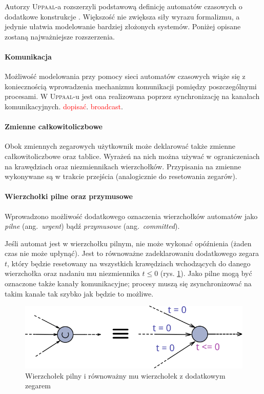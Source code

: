 \documentclass{pracamgr}
\newcommand{\ang}[1]{(ang.~\emph{#1})}
\newcommand{\todo}[1]{\textcolor{red}{#1}}
\newcommand{\upp}{\textsc{Uppaal}}
\theoremstyle{plain}
\begin{document}
Autorzy \upp-a rozszerzyli podstawową definicję automatów czasowych o
dodatkowe konstrukcje \cite{by-lncs04}. Większość nie zwiększa siły
wyrazu formalizmu, a jedynie ułatwia modelowanie bardziej złożonych
systemów.  Poniżej opisane zostaną najważniejsze rozszerzenia.

\paragraph{Komunikacja} Możliwość modelowania przy pomocy sieci
automatów czasowych wiąże się z koniecznością wprowadzenia mechanizmu
komunikacji pomiędzy poszczególnymi procesami. W \upp-u jest ona
realizowana poprzez synchronizację na kanałach komunikacyjnych.
\todo{dopisać}.
\todo{broadcast}.

\paragraph{Zmienne całkowitoliczbowe} Obok zmiennych zegarowych
użytkownik może deklarować także zmienne całkowitoliczbowe oraz
tablice. Wyrażeń na nich można używać w ograniczeniach na krawędziach
oraz niezmiennikach wierzchołków. Przypisania na zmienne wykonywane są
w trakcie przejścia (analogicznie do resetowania zegarów).

\paragraph{Wierzchołki pilne oraz przymusowe} Wprowadzono możliwość
dodatkowego oznaczenia wierzchołków automatów jako \emph{pilne}
\ang{urgent} bądź \emph{przymusowe} \ang{committed}.

Jeśli automat jest w wierzchołku pilnym, nie może wykonać opóźnienia
(żaden czas nie może upłynąć). Jest to równoważne zadeklarowaniu
dodatkowego zegara $t$, który będzie resetowany na wszystkich
krawędziach wchodzących do danego wierzchołka oraz nadaniu mu
niezmiennika $t \leq 0$ (rys. \ref{img:uppaal-urgent}). Jako pilne mogą być
oznaczone także kanały komunikacyjne; procesy muszą się
zsynchronizować na takim kanale tak szybko jak będzie to możliwe.

\begin{figure}[ht]
  \centering
  \includegraphics[width=.8\textwidth]{img/uppaal-urgent}
  \caption{Wierzchołek pilny i równoważny mu wierzchołek z dodatkowym
    zegarem}
  \label{img:uppaal-urgent}
\end{figure}
\end{document}
